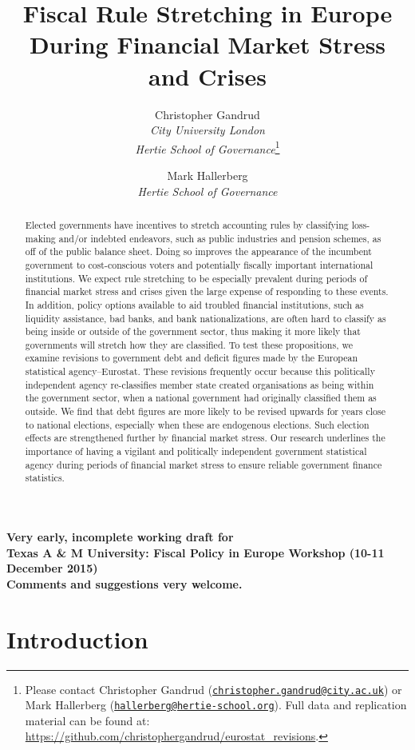 \documentclass[]{article}
\title{Fiscal Rule Stretching in Europe During Financial Market Stress and Crises}
\author{Christopher Gandrud \\ \emph{City University London} \\ \emph{Hertie School of Governance}\footnote{Please contact Christopher Gandrud
(\href{mailto:christopher.gandrud@city.ac.uk}{\nolinkurl{christopher.gandrud@city.ac.uk}}) or Mark Hallerberg (\href{mailto:hallerberg@hertie-school.org}{\nolinkurl{hallerberg@hertie-school.org}}). Full data and replication material can be found at: \url{https://github.com/christophergandrud/eurostat_revisions}.}
\and
Mark Hallerberg \\ \emph{Hertie School of Governance}}
\begin{document}
\maketitle


\begin{center}
    \textbf{Very early, incomplete working draft for\\ Texas A \& M University: Fiscal Policy in Europe Workshop (10-11 December 2015) \\
    Comments and suggestions very welcome.}
\end{center}

\begin{abstract}
    Elected governments have incentives to stretch accounting rules by classifying loss-making and/or indebted endeavors, such as public industries and pension schemes, as off of the public balance sheet. Doing so improves the appearance of the incumbent government to cost-conscious voters and potentially fiscally important international institutions. We expect rule stretching to be especially prevalent during periods of financial market stress and crises given the large expense of responding to these events. In addition, policy options available to aid troubled financial institutions, such as liquidity assistance, bad banks, and bank nationalizations, are often hard to classify as being inside or outside of the government sector, thus making it more likely that governments will stretch how they are classified. To test these propositions, we examine revisions to government debt and deficit figures made by the European statistical agency--Eurostat. These revisions frequently occur because this politically independent agency re-classifies member state created organisations as being within the government sector, when a national government had originally classified them as outside. We find that debt figures are more likely to be revised upwards for years close to national elections, especially when these are endogenous elections. Such election effects are strengthened further by financial market stress. Our research underlines the importance of having a vigilant and politically independent government statistical agency during periods of financial market stress to ensure reliable government finance statistics.
\end{abstract}

\section{Introduction}
\end{document}

